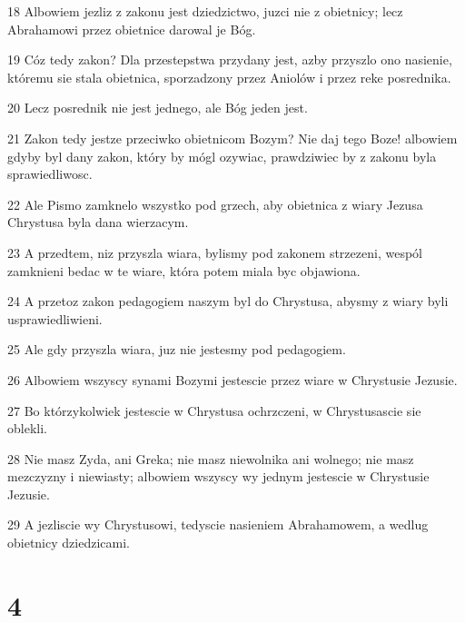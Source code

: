 \par 18 Albowiem jezliz z zakonu jest dziedzictwo, juzci nie z obietnicy; lecz Abrahamowi przez obietnice darowal je Bóg.
\par 19 Cóz tedy zakon? Dla przestepstwa przydany jest, azby przyszlo ono nasienie, któremu sie stala obietnica, sporzadzony przez Aniolów i przez reke posrednika.
\par 20 Lecz posrednik nie jest jednego, ale Bóg jeden jest.
\par 21 Zakon tedy jestze przeciwko obietnicom Bozym? Nie daj tego Boze! albowiem gdyby byl dany zakon, który by mógl ozywiac, prawdziwiec by z zakonu byla sprawiedliwosc.
\par 22 Ale Pismo zamknelo wszystko pod grzech, aby obietnica z wiary Jezusa Chrystusa byla dana wierzacym.
\par 23 A przedtem, niz przyszla wiara, bylismy pod zakonem strzezeni, wespól zamknieni bedac w te wiare, która potem miala byc objawiona.
\par 24 A przetoz zakon pedagogiem naszym byl do Chrystusa, abysmy z wiary byli usprawiedliwieni.
\par 25 Ale gdy przyszla wiara, juz nie jestesmy pod pedagogiem.
\par 26 Albowiem wszyscy synami Bozymi jestescie przez wiare w Chrystusie Jezusie.
\par 27 Bo którzykolwiek jestescie w Chrystusa ochrzczeni, w Chrystusascie sie oblekli.
\par 28 Nie masz Zyda, ani Greka; nie masz niewolnika ani wolnego; nie masz mezczyzny i niewiasty; albowiem wszyscy wy jednym jestescie w Chrystusie Jezusie.
\par 29 A jezliscie wy Chrystusowi, tedyscie nasieniem Abrahamowem, a wedlug obietnicy dziedzicami.

\chapter{4}

